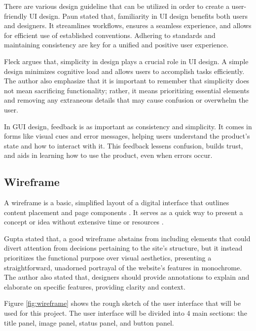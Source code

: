 There are various design guideline that can be utilized in order to create a user-friendly UI design. Paun \cite{Paun_2020} stated that, familiarity in UI design benefits both users and designers. It streamlines workflows, ensures a seamless experience, and allows for efficient use of established conventions. Adhering to standards and maintaining consistency are key for a unified and positive user experience.

Fleck \cite{Fleck_2021} argues that, simplicity in design plays a crucial role in UI design.  A simple design minimizes cognitive load and allows users to accomplish tasks efficiently. The author also emphasize that it is important to remember that simplicity does not mean sacrificing functionality; rather, it means prioritizing essential elements and removing any extraneous details that may cause confusion or overwhelm the user.

In GUI design, feedback is as important as consistency and simplicity. It comes in forms like visual cues and error messages, helping users understand the product's state and how to interact with it. This feedback lessens confusion, builds trust, and aids in learning how to use the product, even when errors occur. \cite{Florido_2022}

\subsection{Wireframe}
\label{subsec:wireframe}

A wireframe is a basic, simplified layout of a digital interface that outlines content placement and page components \cite{White_2023}. It serves as a quick way to present a concept or idea without extensive time or resources \cite{White_2023}.

Gupta \cite{Gupta_2023} stated that, a good wireframe abstains from including elements that could divert attention from decisions pertaining to the site's structure, but it instead prioritizes the functional purpose over visual aesthetics, presenting a straightforward, unadorned portrayal of the website's features in monochrome. The  author also stated that, designers should provide annotations to explain and elaborate on specific features, providing clarity and context.

Figure \ref{fig:wireframe} shows the rough sketch of the user interface that will be used for this project. The user interface will be divided into 4 main sections: the title panel, image panel, status panel, and button panel.

